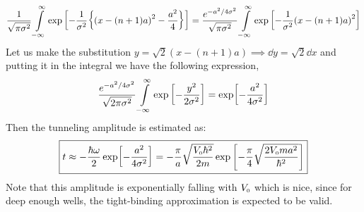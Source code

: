\documentclass[usenames, svgnames, dvipsnames]{scrartcl}
\newcommand{\tund}[1]{_{\text{\tiny #1}}}
\begin{document}
 \begin{align*}
     \frac{1}{\sqrt{\pi \sigma^2}}\int\limits_{-\infty}^{\infty} \exp\qty[-\frac{1}{\sigma^2}\qty{\qty(x-(n+1)a)^2 - \frac{a^2}{4}}]= \frac{e^{-a^2/4\sigma^2}}{\sqrt{\pi \sigma^2}}\int\limits_{-\infty}^{\infty} \exp\qty[-\frac{1}{\sigma^2}\qty(x-(n+1)a)^2]
 \end{align*}
Let us make the substitution $y = \sqrt{2}(x-(n+1)a) \implies \dd y = \sqrt{2}\dd x$ and putting it in the integral we have the following expression, 
\begin{align*}
    \frac{e^{-a^2/4\sigma^2}}{\sqrt{2 \pi \sigma^2}}\int\limits_{-\infty}^{\infty} \exp\qty[-\frac{y^2}{2\sigma^2}] =\exp[-\frac{a^2}{4\sigma^2}]
\end{align*}
Then the tunneling amplitude is estimated as: 
$$\boxed{t\approx -\frac{\hbar\omega}{2}\exp[-\frac{a^2}{4\sigma^2}] = -\frac{\pi}{a}\sqrt{\frac{V\tund{0}\hbar^2}{2m}}\exp\qty[-\frac{\pi}{4}\sqrt{\frac{2V\tund{0}ma^2}{\hbar^2}}]}$$
Note that this amplitude is exponentially falling with $V\tund{0}$ which is nice, since for deep enough wells, the tight-binding approximation is expected to be valid. 
\end{document}
